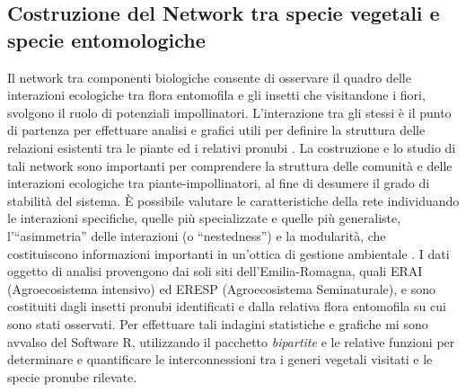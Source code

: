 \documentclass[main.tex]{subfiles}
\begin{document}
\subsection{Costruzione del Network tra specie vegetali e specie entomologiche}\label{Cap. 2.11}

Il network tra componenti biologiche consente di osservare il quadro delle interazioni ecologiche tra flora entomofila e gli insetti che visitandone i fiori, svolgono il ruolo di potenziali impollinatori. L’interazione tra gli stessi è il punto di partenza per effettuare analisi e grafici utili per definire la struttura delle relazioni esistenti tra le piante ed i relativi pronubi \citep{mara}.
La costruzione e lo studio di tali network sono importanti per comprendere la struttura delle comunità e delle interazioni ecologiche tra piante-impollinatori, al fine di desumere il grado di stabilità del sistema. È possibile valutare le caratteristiche della rete individuando le interazioni specifiche, quelle più specializzate e quelle più generaliste, l’“asimmetria” delle interazioni (o “nestedness”) e la modularità, che costituiscono informazioni importanti in un’ottica di gestione ambientale \citep{bosch}.
I dati oggetto di analisi provengono dai soli siti dell’Emilia-Romagna, quali ERAI (Agroecosistema intensivo) ed ERESP (Agroecosistema Seminaturale), e sono costituiti dagli insetti pronubi identificati e dalla relativa flora entomofila su cui sono stati osservati.
Per effettuare tali indagini statistiche e grafiche mi sono avvalso del Software R, utilizzando il pacchetto \textit{bipartite} \citep{dev} e le relative funzioni per determinare e quantificare le interconnessioni tra i generi vegetali visitati e le specie pronube rilevate.
\end{document}
